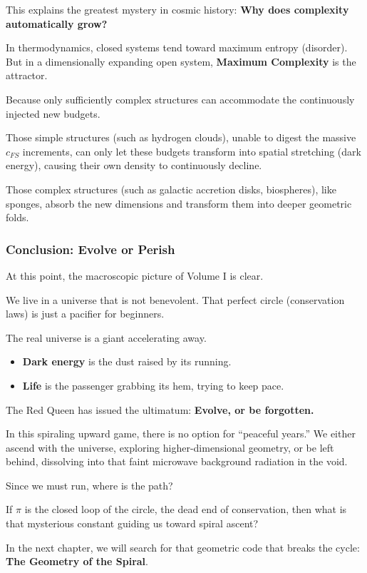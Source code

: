 This explains the greatest mystery in cosmic history: \textbf{Why does complexity automatically grow?}

In thermodynamics, closed systems tend toward maximum entropy (disorder). But in a dimensionally expanding open system, \textbf{Maximum Complexity} is the attractor.

Because only sufficiently complex structures can accommodate the continuously injected new budgets.

Those simple structures (such as hydrogen clouds), unable to digest the massive $c_{FS}$ increments, can only let these budgets transform into spatial stretching (dark energy), causing their own density to continuously decline.

Those complex structures (such as galactic accretion disks, biospheres), like sponges, absorb the new dimensions and transform them into deeper geometric folds.

\subsubsection{Conclusion: Evolve or Perish}

At this point, the macroscopic picture of Volume I is clear.

We live in a universe that is not benevolent. That perfect circle (conservation laws) is just a pacifier for beginners.

The real universe is a giant accelerating away.

\begin{itemize}
\item \textbf{Dark energy} is the dust raised by its running.

\item \textbf{Life} is the passenger grabbing its hem, trying to keep pace.
\end{itemize}

The Red Queen has issued the ultimatum: \textbf{Evolve, or be forgotten.}

In this spiraling upward game, there is no option for ``peaceful years.'' We either ascend with the universe, exploring higher-dimensional geometry, or be left behind, dissolving into that faint microwave background radiation in the void.

Since we must run, where is the path?

If $\pi$ is the closed loop of the circle, the dead end of conservation, then what is that mysterious constant guiding us toward spiral ascent?

In the next chapter, we will search for that geometric code that breaks the cycle: \textbf{The Geometry of the Spiral}.

